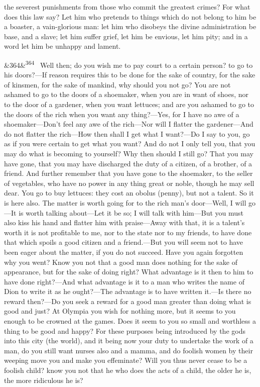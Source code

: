 \documentclass[12pt]{article}
\newcommand{\para}[1][]{\par\noindent\ifx&#1&\else\textsuperscript{\footnotesize #1}~\fi}
\begin{document}
the severest punishments from those who commit the greatest crimes? For what does this law say? Let him who pretends to things which do not belong to him be a boaster, a vain-glorious man: let him who disobeys the divine administration be base, and a slave; let him suffer grief, let him be envious, let him pity; and in a word let him be unhappy and lament.

\para[364] Well then; do you wish me to pay court to a certain person? to go to his doors?—If reason requires this to be done for the sake of country, for the sake of kinsmen, for the sake of mankind, why should you not go? You are not ashamed to go to the doors of a shoemaker, when you are in want of shoes, nor to the door of a gardener, when you want lettuces; and are you ashamed to go to the doors of the rich when you want any thing?—Yes, for I have no awe of a shoemaker—Don't feel any awe of the rich—Nor will I flatter the gardener—And do not flatter the rich—How then shall I get what I want?—Do I say to you, go as if you were certain to get what you want? And do not I only tell you, that you may do what is becoming to yourself? Why then should I still go? That you may have gone, that you may have discharged the duty of a citizen, of a brother, of a friend. And further remember that you have gone to the shoemaker, to the seller of vegetables, who have no power in any thing great or noble, though he may sell dear. You go to buy lettuces: they cost an obolus (penny), but not a talent. So it is here also. The matter is worth going for to the rich man's door—Well, I will go—It is worth talking about—Let it be so; I will talk with him—But you must also kiss his hand and flatter him with praise—Away with that, it is a talent's worth it is not profitable to me, nor to the state nor to my friends, to have done that which spoils a good citizen and a friend.—But you will seem not to have been eager about the matter, if you do not succeed. Have you again forgotten why you went? Know you not that a good man does nothing for the sake of appearance, but for the sake of doing right? What advantage is it then to him to have done right?—And what advantage is it to a man who writes the name of Dion to write it as he ought?—The advantage is to have written it.—Is there no reward then?—Do you seek a reward for a good man greater than doing what is good and just? At Olympia you wish for nothing more, but it seems to you enough to be crowned at the games. Does it seem to you so small and worthless a thing to be good and happy? For these purposes being introduced by the gods into this city (the world), and it being now your duty to undertake the work of a man, do you still want nurses also and a mamma, and do foolish women by their weeping move you and make you effeminate? Will you thus never cease to be a foolish child? know you not that he who does the acts of a child, the older he is, the more ridiculous he is?
\end{document}
